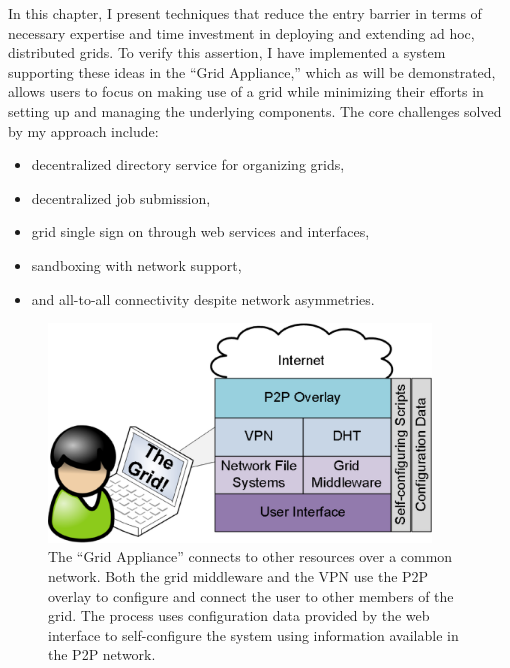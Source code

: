 In this chapter, I present techniques that reduce the entry barrier in terms of
necessary expertise and time investment in deploying and extending ad hoc,
distributed grids.  To verify this assertion, I have implemented a system
supporting these ideas in the ``Grid Appliance,'' which as will be
demonstrated, allows users to focus on making use of a grid while minimizing
their efforts in setting up and managing the underlying components.  The core
challenges solved by my approach include:

\begin{itemize}
\item decentralized directory service for organizing grids,
\item decentralized job submission,
\item grid single sign on through web services and interfaces,
\item sandboxing with network support,
\item and all-to-all connectivity despite network asymmetries.
\end{itemize}

\begin{figure}
\centering
\includegraphics[width=4in]{figs/appliance_overlays.eps}
\caption[Grid Appliance middlware]{The ``Grid Appliance'' connects to other
resources over a common network.  Both the grid middleware and the VPN use the
P2P overlay to configure and connect the user to other members of the grid.
The process uses configuration data provided by the web interface to
self-configure the system using information available in the P2P network.}
\label{fig:appliance}
\end{figure}

